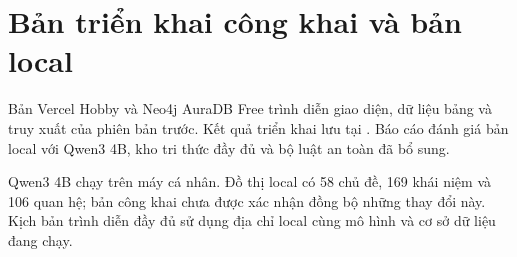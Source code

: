 \section{Bản triển khai công khai và bản local}
Bản Vercel Hobby và Neo4j AuraDB Free trình diễn giao diện, dữ liệu bảng và truy xuất của phiên bản trước. Kết quả triển khai lưu tại . Báo cáo đánh giá bản local với Qwen3 4B, kho tri thức đầy đủ và bộ luật an toàn đã bổ sung.

Qwen3 4B chạy trên máy cá nhân. Đồ thị local có 58 chủ đề, 169 khái niệm và 106 quan hệ; bản công khai chưa được xác nhận đồng bộ những thay đổi này. Kịch bản trình diễn đầy đủ sử dụng địa chỉ local cùng mô hình và cơ sở dữ liệu đang chạy.
